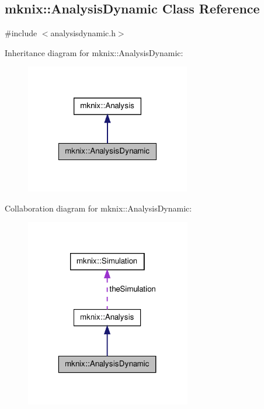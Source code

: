 \hypertarget{classmknix_1_1_analysis_dynamic}{\subsection{mknix\-:\-:Analysis\-Dynamic Class Reference}
\label{classmknix_1_1_analysis_dynamic}
}


{\ttfamily \#include $<$analysisdynamic.\-h$>$}



Inheritance diagram for mknix\-:\-:Analysis\-Dynamic\-:\nopagebreak
\begin{figure}[H]
\begin{center}
\leavevmode
\includegraphics[width=204pt]{da/dfd/classmknix_1_1_analysis_dynamic__inherit__graph}
\end{center}
\end{figure}


Collaboration diagram for mknix\-:\-:Analysis\-Dynamic\-:\nopagebreak
\begin{figure}[H]
\begin{center}
\leavevmode
\includegraphics[width=205pt]{d7/d8a/classmknix_1_1_analysis_dynamic__coll__graph}
\end{center}
\end{figure}
